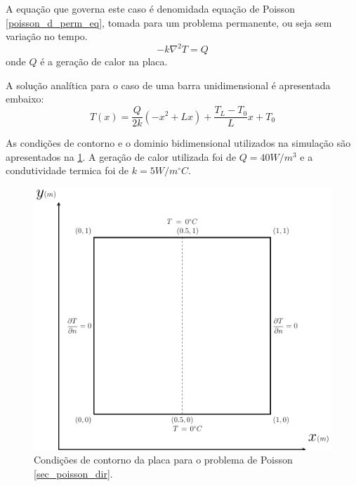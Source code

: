 A equação que governa este caso é denomidada equação de Poisson \eqref{poisson_d_perm_eq}, tomada para um problema permanente, ou seja sem variação no tempo.
\begin{equation}
    -k\nabla^2 T = Q
    \label{poisson_d_perm_eq} 
\end{equation}
onde $Q$ é a geração de calor na placa.

A solução analítica para o caso de uma barra unidimensional é apresentada embaixo:
\begin{equation}
    T(x) = \dfrac{Q}{2k}\left(-x^2 + L x\right) + \dfrac{T_L-T_0}{L} x + T_0
    \label{poisson_d_sol} 
\end{equation}

As condições de contorno e o dominio bidimensional utilizados na simulação são apresentados na \ref{poisson_d_bc}.
A geração de calor utilizada foi de $Q = 40W/m^3$ e a condutividade termica foi de $k=5 W/m^{\circ}C$.
\begin{figure}[H]
    \centering
    \includegraphics[width=.7\linewidth]{figures/poisson_dirichlet_boundary_conditions.pdf}
    \caption{Condições de contorno da placa para o problema de Poisson \ref{sec_poisson_dir}.}
    \label{poisson_d_bc}
\end{figure}

